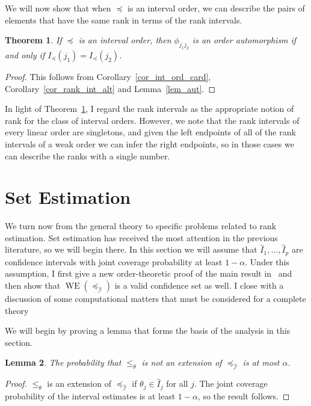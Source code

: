 \documentclass[12pt]{article}
\newcommand{\iord}{{\preceq_{\hat{\mathcal{I}}}}}
\newcommand{\pord}{{\leqslant_{\theta}}}
\newcommand{\WE}[1]{\operatorname{WE}(#1)}
\newtheorem{theorem}{Theorem}
\numberwithin{theorem}{section}
\newtheorem{lemma}[theorem]{Lemma}
\begin{document}
We will now show that when $\preceq$ is an interval order, we can describe the pairs of elements that have the same rank in terms of the rank intervals.

\begin{theorem}
\label{thm_rank_int_rank}
If $\preceq$ is an interval order, then $\phi_{j_1j_2}$ is an order automorphism if and only if $I_\preceq(j_1) = I_\preceq(j_2)$.
\end{theorem}
\begin{proof}
This follows from Corollary~\ref{cor_int_ord_card}, Corollary~\ref{cor_rank_int_alt} and Lemma~\ref{lem_aut}.
\end{proof}

In light of Theorem~\ref{thm_rank_int_rank}, I regard the rank intervals as the appropriate notion of rank for the class of interval orders.  However, we note that the rank intervals of every linear order are singletons, and given the left endpoints of all of the rank intervals of a weak order we can infer the right endpoints, so in those cases we can describe the ranks with a single number.

\section{Set Estimation}
\label{sec_conf_set}

We turn now from the general theory to specific problems related to rank estimation.  Set estimation has received the most attention in the previous literature, so we will begin there.  In this section we will assume that $\hat{I}_1, \dots, \hat{I}_p$ are confidence intervals with joint coverage probability at least $1 - \alpha$.  Under this assumption, I first give a new order-theoretic proof of the main result in~\cite{klein2020jointCR} and then show that $\WE{\iord}$ is a valid confidence set as well.  I close with a discussion of some computational matters that must be considered for a complete theory

We will begin by proving a lemma that forms the basis of the analysis in this section.

\begin{lemma}
\label{lem_cover_prob}
The probability that $\pord$ is not an extension of $\iord$ is at most $\alpha$.
\end{lemma}
\begin{proof}
$\pord$ is an extension of $\iord$ if $\theta_j \in \hat{I}_j$ for all $j$.  The joint coverage probability of the interval estimates is at least $1 - \alpha$, so the result follows.
\end{proof}
\end{document}
